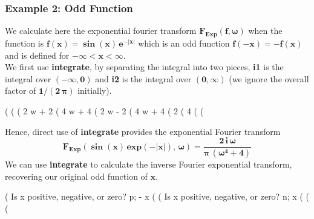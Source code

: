 \documentclass[12pt]{article}
\newcommand{\tcbr}{\textcolor{BrickRed}}
\begin{document}
\subsubsection{Example 2: Odd Function}  
We calculate here the exponential fourier transform $\mathbf{F_{Exp}(f,\boldsymbol{\omega})}$
  when the function is $\mathbf{f(x) = \sin(x) \, e^{-\vert x \vert} }$ which is
  an odd function $\mathbf{f(-x) = -f(x)}$ and is defined for $\mathbf{-\infty < x < \infty}$.\\
  
\noindent We first use \textbf{integrate}, by separating the integral into two pieces,
  \textbf{i1} is the integral over $\mathbf{(-\infty,0)}$ and \textbf{i2} is the integral
  over $\mathbf{(0,\infty)}$ (we ignore the overall factor of $\mathbf{1/(2\,\boldsymbol{\pi}) }$
  initially).
\begin{myVerbatim}
(%
(%
(%
                                 2
                                w  + 2 %
(%
                                     4
                                    w  + 4
(%
                                  2
                                 w  - 2 %
(%
                                      4
                                     w  + 4
(%
                                    2 %
(%
                                       4
(%
(%
\end{myVerbatim}
Hence, direct use of \textbf{integrate} provides the exponential Fourier transform
\begin{equation}
\mathbf{F_{Exp}(\sin(x)\,exp(-\vert x \vert),\, \boldsymbol{\omega}) = 
 \frac{2\,i\,\boldsymbol{\omega}}{\boldsymbol{\pi}\,( \boldsymbol{\omega}^{4} + 4) } }
\end{equation}
We can use \textbf{integrate} to calculate the \tcbr{inverse} Fourier exponential transform,
  recovering our original odd function of $\mathbf{x}$.
\begin{myVerbatim}
(%
Is  x  positive, negative, or zero?
p;
                                   - x
(%
(%
Is  x  positive, negative, or zero?
n;
                                    x
(%
(%
(%
\end{myVerbatim}
\end{document}
